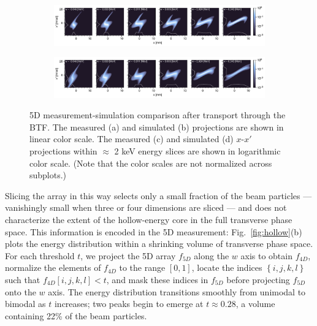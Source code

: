 \documentclass[letterpaper,
               nospread,
               biblatex,
              ]{jacow}
\begin{document}
\begin{figure}[!t]
\begin{subfigure}{0.48\textwidth}
        \caption{}
        \label{fig:VS34_b}
    \end{subfigure}
    \vfill
    \vfill
    \begin{subfigure}{\textwidth}
        \includegraphics[width=\textwidth]{FRXD3f2c.pdf}
        \caption{}
        \label{fig:VS34_c}
    \end{subfigure}
    \vfill
    \vfill
    \begin{subfigure}{\textwidth}
        \includegraphics[width=\textwidth]{FRXD3f2d.pdf}
        \caption{}
        \label{fig:VS34_d}
    \end{subfigure}
    \caption{5D measurement-simulation comparison after transport through the BTF. The measured (a) and simulated (b) projections are shown in linear color scale. The measured (c) and simulated (d) $x$-$x'$ projections within $\approx$ 2 keV energy slices are shown in logarithmic color scale. (Note that the color scales are not normalized across subplots.)}
    \label{fig:VS34}
\end{figure}
%

Slicing the array in this way selects only a small fraction of the beam particles — vanishingly small when three or four dimensions are sliced — and does not characterize the extent of the hollow-energy core in the full transverse phase space. This information is encoded in the 5D measurement: Fig.~\ref{fig:hollow}(b) plots the energy distribution within a shrinking volume of transverse phase space. For each threshold $t$, we project the 5D array $f_{5D}$ along the $w$ axis to obtain $f_{4D}$, normalize the elements of $f_{4D}$ to the range $[0, 1]$, locate the indices $\left\{i, j, k, l\right\}$ such that $f_{4D}[i, j, k, l] < t$, and mask these indices in $f_{5D}$ before projecting $f_{5D}$ onto the $w$ axis. The energy distribution transitions smoothly from unimodal to bimodal as $t$ increases; two peaks begin to emerge at $t \approx 0.28$, a volume containing 22\% of the beam particles.
\end{document}
